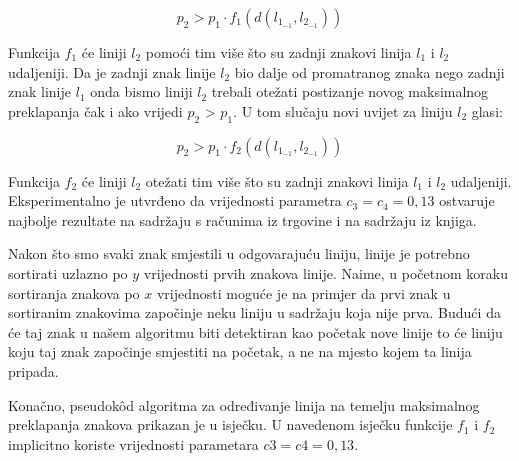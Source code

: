 \documentclass[times, utf8, zavrsni]{fer}
\begin{document}
\begin{equation}
p_2 > p_1 \cdot f_1(d(l_{1_{-1}},l_{2_{-1}}))
\end{equation}

Funkcija $f_1$ će liniji $l_2$ pomoći tim više što su zadnji znakovi linija
$l_1$ i $l_2$ udaljeniji. Da je zadnji znak linije $l_2$ bio dalje od
promatranog znaka nego zadnji znak linije $l_1$ onda bismo liniji $l_2$ trebali
otežati postizanje novog maksimalnog preklapanja čak i ako vrijedi $p_2$ >
$p_1$. U tom slučaju novi uvijet za liniju $l_2$ glasi:

\begin{equation}
    p_2 > p_1 \cdot f_2(d(l_{1_{-1}},l_{2_{-1}}))
\end{equation}

Funkcija $f_2$ će liniji $l_2$ otežati tim više što su zadnji znakovi linija
$l_1$ i $l_2$ udaljeniji. Eksperimentalno je utvrđeno da vrijednosti parametra
$c_3 = c_4 = 0{,}13$ ostvaruje najbolje rezultate na sadržaju s računima iz
trgovine i na sadržaju iz knjiga.

Nakon što smo svaki znak smjestili u odgovarajuću liniju, linije je potrebno
sortirati uzlazno po $y$ vrijednosti prvih znakova linije. Naime, u početnom
koraku sortiranja znakova po $x$ vrijednosti moguće je na primjer da prvi znak
u sortiranim znakovima započinje neku liniju u sadržaju koja nije prva.
Budući da će taj znak u našem algoritmu biti detektiran kao početak nove linije
to će liniju koju taj znak započinje smjestiti na početak, a ne na mjesto kojem
ta linija pripada.

Konačno, pseudokôd algoritma za određivanje linija na temelju maksimalnog
preklapanja znakova prikazan je u isječku. U navedenom isječku funkcije $f_1$ i
$f_2$ implicitno koriste vrijednosti parametara $c3 = c4 = 0{,}13$.
\end{document}
